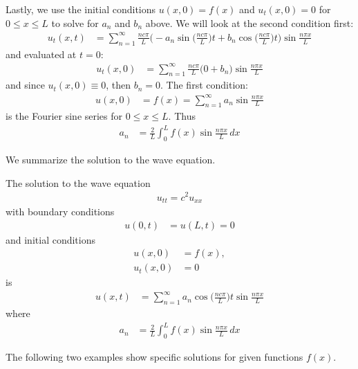 Lastly, we use the initial conditions $u(x,0)=f(x)$  and $u_t(x,0)=0$  for $0 \leq x \leq L$ to solve for $a_n$ and $b_n$ above.  We will look at the second condition first:
%
\begin{align*}
u_t(x,t) & = \sum_{n=1}^{\infty} \frac{n c \pi}{L} \biggl( -a_n \sin \biggl( \frac{n c \pi }{L} \biggr) t + b_n \cos \biggl( \frac{n c \pi }{L} \biggr) t \biggr) \sin \frac{n \pi x}{L}  
\end{align*}
and evaluated at $t=0$:
%
\begin{align*}
u_t(x,0) &= \sum_{n=1}^{\infty} \frac{n c \pi}{L} \biggl( 0 + b_n \biggr) \sin \frac{n \pi x}{L} 
\end{align*}
and since $u_t(x,0)\equiv 0$, then $b_n=0$.  The first condition:
% 
\begin{align*}
u(x,0) & = f(x) = \sum_{n=1}^{\infty}  a_n \sin \frac{n \pi x}{L}   
\end{align*}
is the Fourier sine series for $0 \leq x \leq L$.   Thus
%
\begin{align*}
a_n & = \frac{2}{L} \int_{0}^L f(x) \sin \frac{n \pi x}{L} \, dx 
\end{align*}

We summarize the solution to the wave equation. 

\begin{Boxed*}
The solution to the wave equation 
%
\begin{align*}
u_{tt} =c^2 u_{xx}
\end{align*}
with boundary conditions
%
\begin{align*}
u(0,t)& = u(L,t) = 0
\end{align*}
and initial conditions
\begin{align*}
u(x,0) & = f(x), \\
u_t(x,0) & = 0 
\end{align*}
is
\begin{align*}
u(x,t) & = \sum_{n=1}^{\infty}  a_n \cos \biggl( \frac{n c \pi }{L} \biggr) t  \sin \frac{n \pi x}{L}  
\end{align*}
where
%
\begin{align*}
a_n & = \frac{2}{L} \int_0^L f(x) \sin \frac{n\pi x}{L} \, dx 
\end{align*}
\end{Boxed*}

\bigskip

The following two examples show specific solutions for given functions $f(x)$.  



